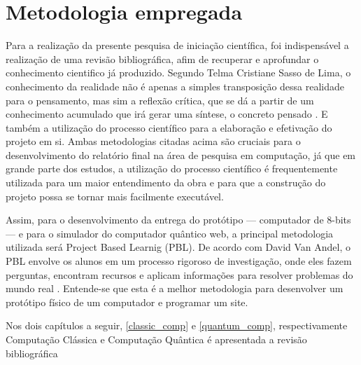 \section{Metodologia empregada}
\label{methodologies}
Para a realização da presente pesquisa de iniciação científica, foi indispensável a realização de uma revisão bibliográfica, afim de recuperar e aprofundar o conhecimento cientifico já produzido. Segundo Telma Cristiane Sasso de Lima, o conhecimento da realidade não é apenas a simples transposição dessa realidade para o pensamento, mas sim a reflexão crítica, que se dá a partir de um conhecimento acumulado que irá gerar uma síntese, o concreto pensado \cite{1}. E também a utilização do processo científico para a elaboração e efetivação do projeto em si. Ambas metodologias citadas acima são cruciais para o desenvolvimento do relatório final na área de pesquisa em computação, já que em grande parte dos estudos, a utilização do processo científico é frequentemente utilizada para um maior entendimento da obra e para que a construção do projeto possa se tornar mais facilmente executável.

Assim, para o desenvolvimento da entrega do protótipo — computador de 8-bits — e para o simulador do computador quântico web, a principal metodologia utilizada será Project Based Learnig (PBL). De acordo com David Van Andel, o PBL envolve os alunos em um processo rigoroso de investigação, onde eles fazem perguntas, encontram recursos e aplicam informações para resolver problemas do mundo real \cite{3}. Entende-se que esta é a melhor metodologia para desenvolver um protótipo físico de um computador e programar um site.

Nos dois capítulos a seguir, \ref{classic_comp} e \ref{quantum_comp}, respectivamente Computação Clássica e Computação Quântica é apresentada a revisão bibliográfica 

\newpage